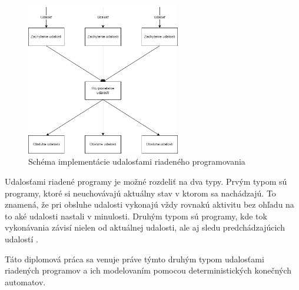 \begin{figure}[!htbp]
  \centering
  \includegraphics[width=0.60\textwidth]{img/event-driven-schema.png}
  \caption{Schéma implementácie udalosťami riadeného programovania}
  \label{figure:event-driven-schema}
\end{figure}

\par
Udalosťami riadené programy je možné rozdeliť na dva typy. Prvým typom sú programy, ktoré si neuchovávajú aktuálny stav v ktorom sa nachádzajú. To znamená, že pri obsluhe udalosti vykonajú vždy rovnakú aktivitu bez ohľadu na to aké udalosti nastali v minulosti. Druhým typom sú programy, kde tok vykonávania závisí nielen od aktuálnej udalosti, ale aj sledu predchádzajúcich udalostí \cite{dashEventDrivenProgramming2011}.
\par Táto diplomová práca sa venuje práve týmto druhým typom udalosťami riadených programov a ich modelovaním pomocou deterministických konečných automatov.